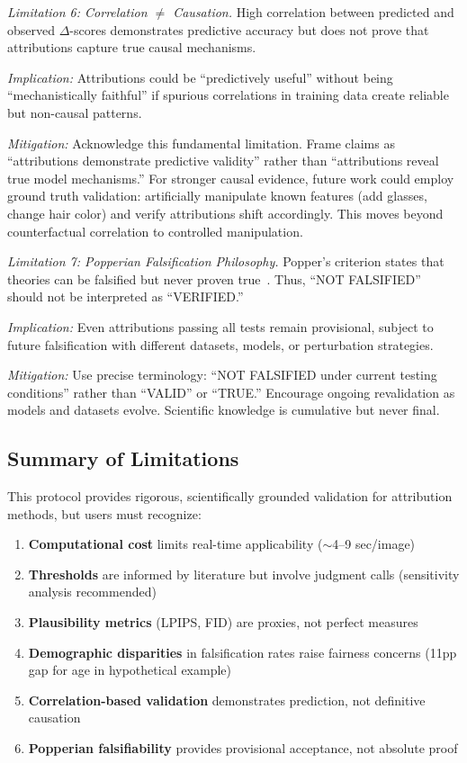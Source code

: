 \textit{Limitation 6: Correlation $\neq$ Causation.} High correlation between predicted and observed $\Delta$-scores demonstrates predictive accuracy but does not prove that attributions capture true causal mechanisms.

\textit{Implication:} Attributions could be ``predictively useful'' without being ``mechanistically faithful'' if spurious correlations in training data create reliable but non-causal patterns.

\textit{Mitigation:} Acknowledge this fundamental limitation. Frame claims as ``attributions demonstrate predictive validity'' rather than ``attributions reveal true model mechanisms.'' For stronger causal evidence, future work could employ ground truth validation: artificially manipulate known features (add glasses, change hair color) and verify attributions shift accordingly. This moves beyond counterfactual correlation to controlled manipulation.

\textit{Limitation 7: Popperian Falsification Philosophy.} Popper's criterion states that theories can be falsified but never proven true~\cite{popper1959logic}. Thus, ``NOT FALSIFIED'' should not be interpreted as ``VERIFIED.''

\textit{Implication:} Even attributions passing all tests remain provisional, subject to future falsification with different datasets, models, or perturbation strategies.

\textit{Mitigation:} Use precise terminology: ``NOT FALSIFIED under current testing conditions'' rather than ``VALID'' or ``TRUE.'' Encourage ongoing revalidation as models and datasets evolve. Scientific knowledge is cumulative but never final.

\subsection{Summary of Limitations}

This protocol provides rigorous, scientifically grounded validation for attribution methods, but users must recognize:
\begin{enumerate}
\item \textbf{Computational cost} limits real-time applicability ($\sim$4--9 sec/image)
\item \textbf{Thresholds} are informed by literature but involve judgment calls (sensitivity analysis recommended)
\item \textbf{Plausibility metrics} (LPIPS, FID) are proxies, not perfect measures
\item \textbf{Demographic disparities} in falsification rates raise fairness concerns (11pp gap for age in hypothetical example)
\item \textbf{Correlation-based validation} demonstrates prediction, not definitive causation
\item \textbf{Popperian falsifiability} provides provisional acceptance, not absolute proof
\end{enumerate}

